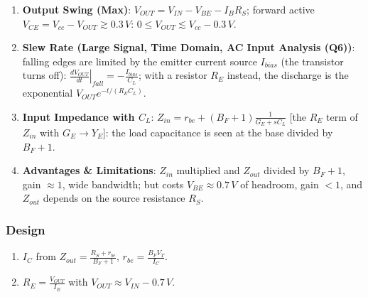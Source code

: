 \begin{enumerate}
    \paragraph{At Output:} \(V_{in} = 0\), \(G_E\) removed, \(I_{test}\) into the emitter. (1) gives
    \(V_b = \frac{g_{be}}{G_S + g_{be}} V_{out}\); the device current into the node is
    \((g_m + g_{be})(V_b - V_{out})\):
    \begin{align*}
      I_{test} + (g_m + g_{be})\left(\frac{g_{be}}{G_S + g_{be}} - 1\right) V_{out} &= 0 \\
      I_{test} &= \frac{(g_m + g_{be}) G_S}{G_S + g_{be}} V_{out} \\
      Z_{out} &= \frac{G_S + g_{be}}{(g_m + g_{be}) G_S} = \frac{(G_S + g_{be}) R_S r_{be}}{(g_m + g_{be}) G_S R_S r_{be}} = \frac{R_S + r_{be}}{B_F + 1}
    \end{align*}
  \item \textbf{Output Swing (Max)}: \(V_{OUT} = V_{IN} - V_{BE} - I_B R_S\); forward active
    \(V_{CE} = V_{cc} - V_{OUT} \gtrsim 0.3\,V\): \(0 \leq V_{OUT} \lesssim V_{cc} - 0.3\,V\).
  \item \textbf{Slew Rate (Large Signal, Time Domain, AC Input Analysis (Q6))}: falling edges are limited by the
    emitter current source \(I_{bias}\) (the transistor turns off): \(\left.\frac{dV_{OUT}}{dt}\right|_{fall} = -\frac{I_{bias}}{C_L}\); with
    a resistor \(R_E\) instead, the discharge is the exponential \(V_{OUT} e^{-t/(R_E C_L)}\).
  \item \textbf{Input Impedance with \(C_L\)}: \(Z_{in} = r_{be} + (B_F + 1)\frac{1}{G_E + sC_L}\) [the \(R_E\) term of \(Z_{in}\) with
    \(G_E \to Y_E\)]: the load capacitance is seen at the base divided by \(B_F + 1\).
  \item \textbf{Advantages \& Limitations}: \(Z_{in}\) multiplied and \(Z_{out}\) divided by
    \(B_F + 1\), gain \(\approx 1\), wide bandwidth; but costs \(V_{BE} \approx 0.7\,V\) of headroom,
    gain \(< 1\), and \(Z_{out}\) depends on the source resistance \(R_S\).
\end{enumerate}

\subsubsection{Design}
\begin{enumerate}
  \item \(I_C\) from \(Z_{out} = \frac{R_S + r_{be}}{B_F + 1}\), \(r_{be} = \frac{B_F V_T}{I_C}\).
  \item \(R_E = \frac{V_{OUT}}{I_E}\) with \(V_{OUT} \approx V_{IN} - 0.7\,V\).
\end{enumerate}

